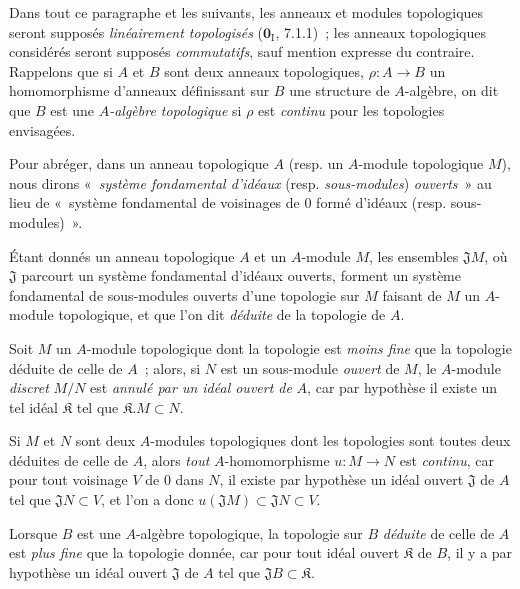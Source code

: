 \begin{env}[19.0.3]
\label{0.19.0.3-fr}
Dans tout ce paragraphe et les suivants, les anneaux et modules topologiques
seront supposés \emph{linéairement topologisés} ($\mathbf{0}_{\mathrm I}$,
7.1.1)~; les anneaux topologiques considérés seront supposés \emph{commutatifs},
sauf mention expresse du contraire. Rappelons que si $A$ et $B$ sont deux
anneaux topologiques, $\rho:A\to B$ un homomorphisme d'anneaux définissant sur
$B$ une structure de $A$-algèbre, on dit que $B$ est une \emph{$A$-algèbre
topologique} si $\rho$ est \emph{continu} pour les topologies envisagées.

Pour abréger, dans un anneau topologique $A$ (resp. un $A$-module topologique
$M$), nous dirons «~\emph{système fondamental d'idéaux} (resp.
\emph{sous-modules}) \emph{ouverts}~» au lieu de «~système fondamental de
voisinages de 0 formé d'idéaux (resp. sous-modules)~».

Étant donnés un anneau topologique $A$ et un $A$-module $M$, les ensembles
$\mathfrak J M$, où $\mathfrak J$ parcourt un système fondamental d'idéaux
ouverts, forment un système fondamental de sous-modules ouverts d'une topologie
sur $M$ faisant de $M$ un $A$-module topologique, et que l'on dit \emph{déduite}
de la topologie de $A$.

Soit $M$ un $A$-module topologique dont la topologie est \emph{moins fine} que
la topologie déduite de celle de $A$~; alors, si $N$ est un sous-module
\emph{ouvert} de $M$, le $A$-module \emph{discret} $M/N$ est \emph{annulé par
un idéal ouvert de} $A$, car par hypothèse il existe un tel idéal $\mathfrak K$
tel que $\mathfrak K.M\subset N$.


Si $M$ et $N$ sont deux $A$-modules topologiques dont les topologies sont toutes
deux déduites de celle de $A$, alors \emph{tout} $A$-homomorphisme $u:M\to N$
est \emph{continu}, car pour tout voisinage $V$ de 0 dans $N$, il existe par
hypothèse un idéal ouvert $\mathfrak J$ de $A$ tel que $\mathfrak JN\subset V$,
et l'on a donc $u(\mathfrak JM)\subset\mathfrak JN\subset V$.

Lorsque $B$ est une $A$-algèbre topologique, la topologie sur $B$ \emph{déduite}
de celle de $A$ est \emph{plus fine} que la topologie donnée, car pour tout
idéal ouvert $\mathfrak K$ de $B$, il y a par hypothèse un idéal ouvert
$\mathfrak J$ de $A$ tel que $\mathfrak JB\subset\mathfrak K$.
\end{env}


